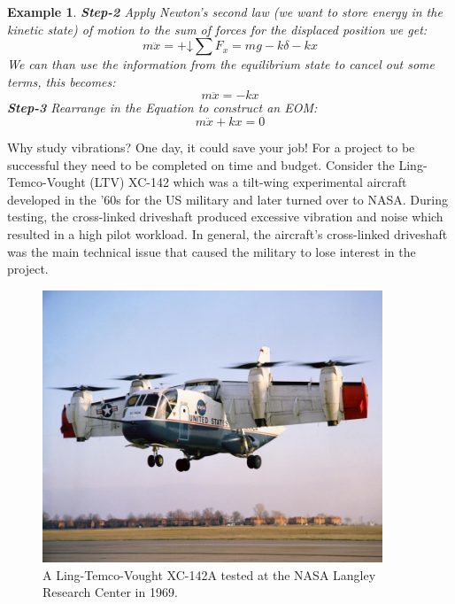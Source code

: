 \documentclass[12pt,letter]{article}
\newtheorem{ex}{Example}
\numberwithin{ex}{section} %
\newenvironment{example}{\begin{mdframed}[middlelinewidth=0.5mm]\begin{ex}\normalfont}{\end{ex}\end{mdframed}}
\numberwithin{re}{section} %
\newtheorem{vcs}{Vibration Case Study}
\numberwithin{vcs}{section} %
\newenvironment{vibration_case_study}{\begin{mdframed}[linecolor=orange,middlelinewidth=2mm,roundcorner=20pt]\begin{vcs}\normalfont}{\end{vcs}\end{mdframed}}
\newcommand*\downplus{%
	\mathbin{+\mathord\downarrow}}								%
\begin{document}
\begin{example}
			\noindent \textbf{Step-2} Apply Newton's second law (we want to store energy in the kinetic state) of motion to the sum of forces for the displaced position we get: 		
			\begin{equation}
				m\ddot{x} = \downplus \sum F_x =mg -k\delta -kx
			\end{equation}
			We can than use the information from the equilibrium state to cancel out some terms, this becomes:
			\begin{equation}
				m\ddot{x} = -kx
			\end{equation}				
			\textbf{Step-3} Rearrange in the Equation to construct an EOM: 					
			\begin{equation}
				m\ddot{x} + kx = 0
			\end{equation}			
		\end{example}		


		\begin{vibration_case_study}
			Why study vibrations? One day, it could save your job! For a project to be successful they need to be completed on time and budget. Consider the Ling-Temco-Vought (LTV) XC-142  which was a tilt-wing experimental aircraft developed in the '60s for the US military and later turned over to NASA. During testing, the cross-linked driveshaft produced excessive vibration and noise which resulted in a high pilot workload. In general, the aircraft's cross-linked driveshaft was the main technical issue that caused the military to lose interest in the project. 
			
			\begin{figure}[H]
				\centering
				\includegraphics[width=4in]{../figures/Ling_Temco_Vought_XC_142A.jpg}
				\caption{A Ling-Temco-Vought XC-142A tested at the NASA Langley Research Center in 1969. \protect\footnotemark[1]}
			\end{figure}
		\end{vibration_case_study}


	
\end{document}
